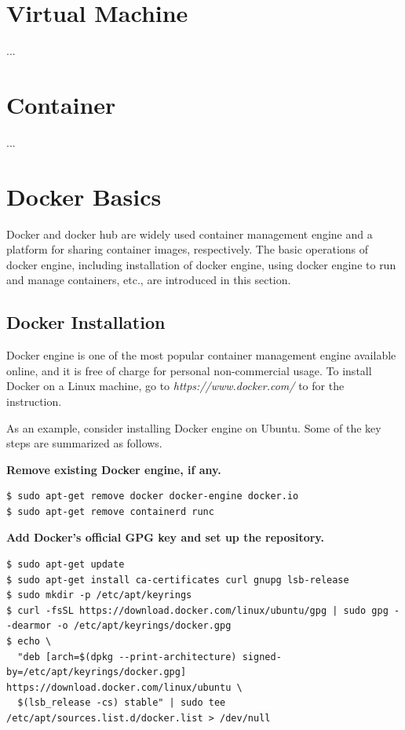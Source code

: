 \section{Virtual Machine}
...
\section{Container}
...
\section{Docker Basics} \label{ch:vac:sec:db}

Docker and docker hub are widely used container management engine and a platform for sharing container images, respectively. The basic operations of docker engine, including installation of docker engine, using docker engine to run and manage containers, etc., are introduced in this section.

\subsection{Docker Installation}

Docker engine is one of the most popular container management engine available online, and it is free of charge for personal non-commercial usage. To install Docker on a Linux machine, go to \textit{https://www.docker.com/} to for the instruction.

As an example, consider installing Docker engine on Ubuntu. Some of the key steps are summarized as follows.

\vspace{0.1in}
\noindent \textbf{Remove existing Docker engine, if any.}
\begin{lstlisting}
$ sudo apt-get remove docker docker-engine docker.io
$ sudo apt-get remove containerd runc
\end{lstlisting}

\vspace{0.1in}
\noindent \textbf{Add Docker's official GPG key and set up the repository.}
\begin{lstlisting}
$ sudo apt-get update
$ sudo apt-get install ca-certificates curl gnupg lsb-release
$ sudo mkdir -p /etc/apt/keyrings
$ curl -fsSL https://download.docker.com/linux/ubuntu/gpg | sudo gpg --dearmor -o /etc/apt/keyrings/docker.gpg
$ echo \
  "deb [arch=$(dpkg --print-architecture) signed-by=/etc/apt/keyrings/docker.gpg] https://download.docker.com/linux/ubuntu \
  $(lsb_release -cs) stable" | sudo tee /etc/apt/sources.list.d/docker.list > /dev/null
\end{lstlisting}

